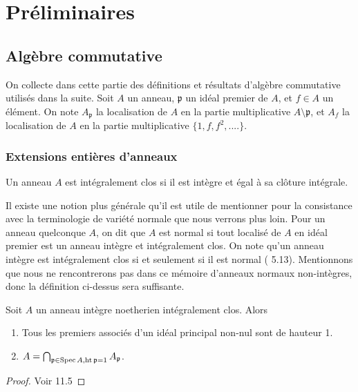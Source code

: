 \chapter{Préliminaires}

\section{Algèbre commutative}

On collecte dans cette partie des définitions et résultats d'algèbre commutative utilisés dans la suite. Soit $A$ un anneau, $\mathfrak{p}$ un idéal premier de $A$, et $f\in A$ un élément. On note $A_\mathfrak{p}$ la localisation de $A$ en la partie multiplicative $A\setminus \mathfrak{p}$, et $A_f$ la localisation de $A$ en la partie multiplicative $\lbrace 1, f, f^2, ....\rbrace$.

\subsection{Extensions entières d'anneaux}

\begin{defn}\label{normalring}
Un anneau $A$ est intégralement clos si il est intègre et égal à sa clôture intégrale. 
\end{defn}

\begin{rem}
Il existe une notion plus générale qu'il est utile de mentionner pour la consistance avec la terminologie de variété normale que nous verrons plus loin. Pour un anneau quelconque $A$, on dit que $A$ est normal si tout localisé de $A$ en idéal premier est un anneau intègre et intégralement clos. On note qu'un anneau intègre est intégralement clos si et seulement si il est normal (\cite{atiyahmacdo} 5.13). Mentionnons que nous ne rencontrerons pas dans ce mémoire d'anneaux normaux non-intègres, donc la définition ci-dessus sera suffisante.
\end{rem}


\begin{thm}\label{factonormal}
Soit $A$ un anneau intègre noetherien intégralement clos. Alors
\begin{enumerate}
\item Tous les premiers associés d'un idéal principal non-nul sont de hauteur 1.
\item $A=\bigcap_{\mathfrak{p}\in \operatorname{Spec} A, \operatorname{ht} \mathfrak{p}=1} A_\mathfrak{p}$.
\end{enumerate}
\end{thm}
\begin{proof}
Voir \cite{Matsumura} 11.5
\end{proof}



